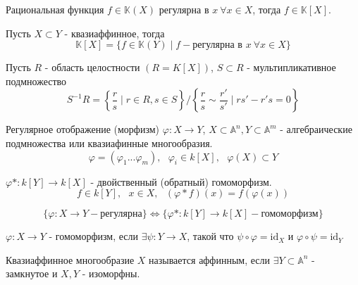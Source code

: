 \documentclass{article}
\begin{document}
\begin{theorem}
    Рациональная функция $f \in \mathbb{K}(X)$ регулярна
    в $x \ \forall x \in X$, тогда $f \in \mathbb{K}[X]$.
\end{theorem}

\begin{definition}
    Пусть $X \subset Y$ - квазиаффинное, тогда
    $$ \mathbb{K} [X] = \{f \in \mathbb{K} (Y)
    \mid f - \text{регулярна в } x \ \forall x \in X\} $$
\end{definition}

\begin{definition}
    Пусть $R$ - область целостности $(R = K[X])$, $S \subset R$ - мультипликативное
    подмножество
    $$
        S^{-1}R = \left\{\frac{r}{s} \mid r \in R, s \in S\right\} /
        \left\{\frac{r}{s} \sim \frac{r'}{s'} \mid rs' - r's = 0\right\}
    $$
\end{definition} 

\begin{definition}
    Регулярное отображение (морфизм) $\varphi : X \to Y$, $X \subset \mathbb{A}^n, Y \subset \mathbb{A}^m$ - алгебраические подмножества или квазиафинные многообразия. 
    $$
        \varphi = (\varphi_1 ... \varphi_m), \ \ \ \varphi_i \in k[X], \ \ \ \varphi(X) \subset Y
    $$
\end{definition}

\begin{definition}
    $\varphi* : k[Y] \to k[X]$ - двойственный (обратный) гомоморфизм.
    $$f \in k[Y], \ \ \ x \in X, \ \ \ (\varphi* f)(x) = f (\varphi(x))$$
\end{definition}

\begin{theorem}
    $$\{ \varphi : X \to Y - \text{регулярна} \} \Longleftrightarrow \{ \varphi* : k[Y] \to k[X] - \text{гомоморфизм} \}$$
\end{theorem}

\begin{definition}
    $\varphi : X \to Y$ - гомоморфизм, если $\exists \psi : Y \to X$, такой что
    $\psi \circ \varphi = \text{id}_X$ и $\varphi \circ \psi = \text{id}_Y$
\end{definition}

\begin{definition}
    Квазиаффинное многообразие $X$ называется аффинным, если
    $\exists Y \subset \mathbb{A}^n$ - замкнутое и $X, Y$ - изоморфны.
\end{definition}
\end{document}
